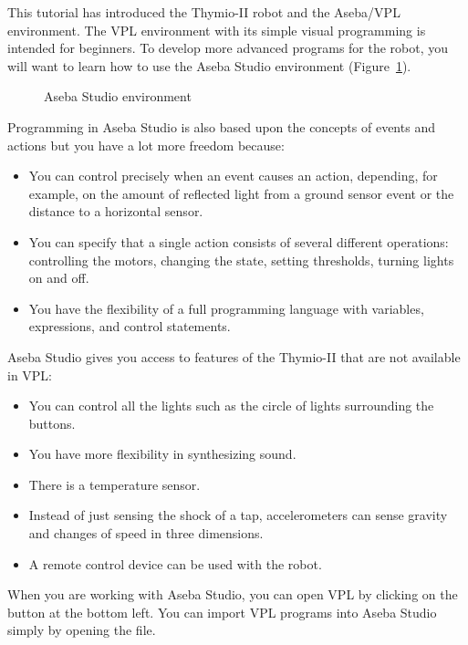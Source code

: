 
This tutorial has introduced the Thymio-II robot and the Aseba/VPL
environment. The VPL environment with its simple visual programming is
intended for beginners. To develop more advanced programs for the robot,
you will want to learn how to use the Aseba Studio environment
(Figure~\ref{fig.studio}).

\begin{figure}[hbt]
\begin{center}
\caption{Aseba Studio environment}\label{fig.studio}
\end{center}
\end{figure}

Programming in Aseba Studio is also based upon the concepts of events
and actions but you have a lot more freedom because:

\begin{itemize}
\item You can control precisely when an event causes an action, depending, for
example, on the amount of reflected light from a ground sensor event or
the distance to a horizontal sensor.
\item You can specify that a single action consists of several different
operations: controlling the motors, changing the state, setting
thresholds, turning lights on and off.
\item You have the flexibility of a full programming language with
variables, expressions, and control statements.
\end{itemize}

Aseba Studio gives you access to features of the Thymio-II that are not
available in VPL:

\begin{itemize}
\item You can control all the lights such as the circle of lights
surrounding the buttons.
\item You have more flexibility in synthesizing sound.
\item There is a temperature sensor.
\item Instead of just sensing the shock of a tap, accelerometers
can sense gravity and changes of speed in three dimensions.
\item A remote control device can be used with the robot.
\end{itemize}

When you are working with Aseba Studio, you can open VPL by clicking on
the button  at the bottom left. You can import VPL
programs into Aseba Studio simply by opening the file.

\bigskip\bigskip\bigskip\bigskip

